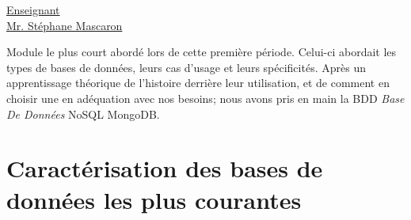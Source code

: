 \renewcommand{\figurename}{}
\renewcommand{\tablename}{}

\vspace*{0.2cm}
      \large
      \href{\@orientadorPagina}{\color{black}Enseignant\\Mr. Stéphane Mascaron}\\
      \normalsize
\vspace*{0.5cm}

Module le plus court abordé lors de cette première période. Celui-ci abordait les types de bases de données, leurs cas d'usage et leurs spécificités. Après un apprentissage théorique de l'histoire derrière leur utilisation, et de comment en choisir une en adéquation avec nos besoins; nous avons pris en main la BDD \textit{Base De Données} NoSQL MongoDB.

\section{Caractérisation des bases de données les plus courantes}


